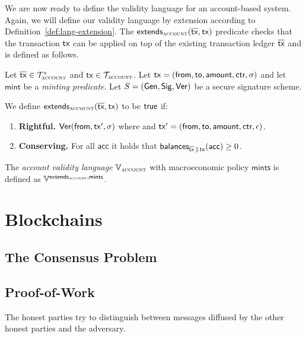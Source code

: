 We are now ready to define the validity language for an account-based system.
Again, we will
define our validity language by extension according to
Definition~\ref{def:lang-extension}.
The $\textsf{extends}_{\textsc{account}}(\overline{\mathsf{tx}}, \mathsf{tx})$ predicate checks that
the transaction $\mathsf{tx}$ can be applied on top of the existing transaction ledger
$\overline{\mathsf{tx}}$ and is defined as follows.

\begin{definition}
  Let $\overline{\mathsf{tx}} \in \mathcal{T}_\textsc{account}^*$ and $\mathsf{tx} \in \mathcal{T}_{\textsc{account}}$.
  Let $\mathsf{tx} = (\textsf{from}, \textsf{to}, \textsf{amount}, \textsf{ctr}, \sigma)$
  and let $\textsf{mint}$ be a \emph{minting predicate}.
  Let $S = (\mathsf{Gen}, \mathsf{Sig}, \mathsf{Ver})$ be a secure signature scheme.

  We define $\textsf{extends}_{\textsc{account}}(\overline{\mathsf{tx}}, \mathsf{tx})$ to be $\textsf{true}$
  if:

  \begin{enumerate}
    \item \textbf{Rightful.}
          $\mathsf{Ver}(\textsf{from}, \mathsf{tx}', \sigma)$ where
          and $\mathsf{tx}' = (\textsf{from}, \textsf{to}, \textsf{amount}, \textsf{ctr}, \epsilon)$.
    \item \textbf{Conserving.}
          For all $\textsf{acc}$ it holds that
          $\textsf{balances}_{\overline{\mathsf{tx}} \,\|\, \mathsf{tx}}(\textsf{acc}) \geq 0$.
  \end{enumerate}

  The \emph{account validity language} $\mathbb{V}_{\textsc{account}}$ with macroeconomic
  policy $\textsf{mints}$ is defined as
  $\mathbb{V}^{\textsf{extends}_{\textsc{account}},\textsf{mints}}$.
\end{definition}


\section{Blockchains}
\subsection{The Consensus Problem}
\subsection{Proof-of-Work}
\cite{pow}
The
honest parties try to distinguish between messages diffused by the other honest
parties and the adversary.


